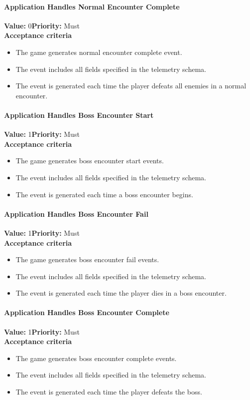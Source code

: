\paragraph{Application Handles Normal Encounter Complete}
\textbf{Value:} 0\quad \textbf{Priority:} Must\\
\textbf{Acceptance criteria}
\begin{itemize}
  \item The game generates normal encounter complete event.
  \item The event includes all fields specified in the telemetry schema.
  \item The event is generated each time the player defeats all enemies in a normal encounter.
\end{itemize}

\paragraph{Application Handles Boss Encounter Start}
\textbf{Value:} 1\quad \textbf{Priority:} Must\\
\textbf{Acceptance criteria}
\begin{itemize}
  \item The game generates boss encounter start events.
  \item The event includes all fields specified in the telemetry schema.
  \item The event is generated each time a boss encounter begins.
\end{itemize}

\paragraph{Application Handles Boss Encounter Fail}
\textbf{Value:} 1\quad \textbf{Priority:} Must\\
\textbf{Acceptance criteria}
\begin{itemize}
  \item The game generates boss encounter fail events.
  \item The event includes all fields specified in the telemetry schema.
  \item The event is generated each time the player dies in a boss encounter.
\end{itemize}

\paragraph{Application Handles Boss Encounter Complete}
\textbf{Value:} 1\quad \textbf{Priority:} Must\\
\textbf{Acceptance criteria}
\begin{itemize}
  \item The game generates boss encounter complete events.
  \item The event includes all fields specified in the telemetry schema.
  \item The event is generated each time the player defeats the boss.
\end{itemize}

